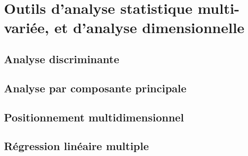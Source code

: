 \chapter{Outils d'analyse statistique multi-variée, et d'analyse dimensionnelle}
\label{app:statmulti}

\section{Analyse discriminante}

\section{Analyse par composante principale}

\section{Positionnement multidimensionnel}

\section{Régression linéaire multiple}